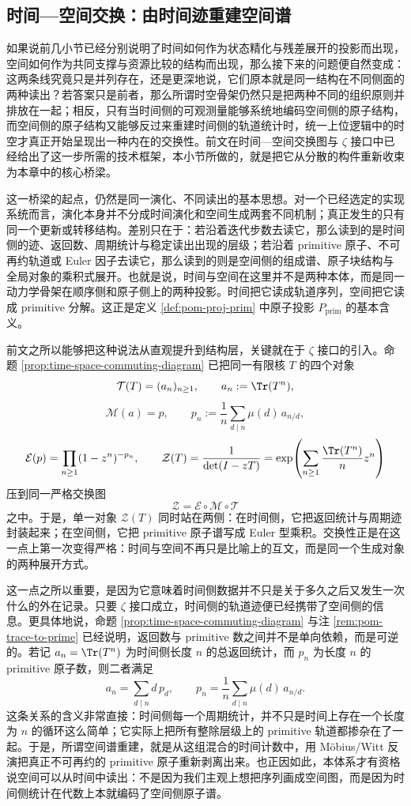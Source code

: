 \subsection{时间—空间交换：由时间迹重建空间谱}\label{subsec:physical-spacetime-skeleton-time-space-exchange}

如果说前几小节已经分别说明了时间如何作为状态精化与残差展开的投影而出现，空间如何作为共同支撑与资源比较的结构而出现，那么接下来的问题便自然变成：这两条线究竟只是并列存在，还是更深地说，它们原本就是同一结构在不同侧面的两种读出？若答案只是前者，那么所谓时空骨架仍然只是把两种不同的组织原则并排放在一起；相反，只有当时间侧的可观测量能够系统地编码空间侧的原子结构，而空间侧的原子结构又能够反过来重建时间侧的轨道统计时，统一上位逻辑中的时空才真正开始呈现出一种内在的交换性。前文在时间—空间交换图与 \(\zeta\) 接口中已经给出了这一步所需的技术框架，本小节所做的，就是把它从分散的构件重新收束为本章中的核心桥梁。

这一桥梁的起点，仍然是同一演化、不同读出的基本思想。对一个已经选定的实现系统而言，演化本身并不分成时间演化和空间生成两套不同机制；真正发生的只有同一个更新或转移结构。差别只在于：若沿着迭代步数去读它，那么读到的是时间侧的迹、返回数、周期统计与稳定读出出现的层级；若沿着 primitive 原子、不可再约轨道或 Euler 因子去读它，那么读到的则是空间侧的组成谱、原子块结构与全局对象的乘积式展开。也就是说，时间与空间在这里并不是两种本体，而是同一动力学骨架在顺序侧和原子侧上的两种投影。时间把它读成轨道序列，空间把它读成 primitive 分解。这正是定义 \ref{def:pom-proj-prim} 中原子投影 \(P_{\mathrm{prim}}\) 的基本含义。

前文之所以能够把这种说法从直观提升到结构层，关键就在于 \(\zeta\) 接口的引入。命题 \ref{prop:time-space-commuting-diagram} 已把同一有限核 \(T\) 的四个对象
\[
\mathcal{T}(T)=(a_n)_{n\ge 1},\qquad a_n:=\Tr(T^n),
\]
\[
\mathcal{M}(a)=p,\qquad
p_n:=\frac{1}{n}\sum_{d\mid n}\mu(d)\,a_{n/d},
\]
\[
\mathcal{E}(p)=\prod_{n\ge 1}(1-z^n)^{-p_n},
\qquad
\mathcal{Z}(T)=\frac{1}{\det(I-zT)}
=\exp\!\left(\sum_{n\ge 1}\frac{\Tr(T^n)}{n}z^n\right)
\]
压到同一严格交换图
\[
\mathcal{Z}=\mathcal{E}\circ\mathcal{M}\circ\mathcal{T}
\]
之中。于是，单一对象 \(\mathcal{Z}(T)\) 同时站在两侧：在时间侧，它把返回统计与周期迹封装起来；在空间侧，它把 primitive 原子谱写成 Euler 型乘积。交换性正是在这一点上第一次变得严格：时间与空间不再只是比喻上的互文，而是同一个生成对象的两种展开方式。

这一点之所以重要，是因为它意味着时间侧数据并不只是关于多久之后又发生一次什么的外在记录。只要 \(\zeta\) 接口成立，时间侧的轨道迹便已经携带了空间侧的信息。更具体地说，命题 \ref{prop:time-space-commuting-diagram} 与注 \ref{rem:pom-trace-to-prime} 已经说明，返回数与 primitive 数之间并不是单向依赖，而是可逆的。若记 \(a_n=\Tr(T^n)\) 为时间侧长度 \(n\) 的总返回统计，而 \(p_n\) 为长度 \(n\) 的 primitive 原子数，则二者满足
\[
a_n=\sum_{d\mid n} d\,p_d,
\qquad
p_n=\frac{1}{n}\sum_{d\mid n}\mu(d)\,a_{n/d}.
\]
这条关系的含义非常直接：时间侧每一个周期统计，并不只是时间上存在一个长度为 \(n\) 的循环这么简单；它实际上把所有整除层级上的 primitive 轨道都掺杂在了一起。于是，所谓空间谱重建，就是从这组混合的时间计数中，用 Möbius/Witt 反演把真正不可再约的 primitive 原子重新剥离出来。也正因如此，本体系才有资格说空间可以从时间中读出：不是因为我们主观上想把序列画成空间图，而是因为时间侧统计在代数上本就编码了空间侧原子谱。

